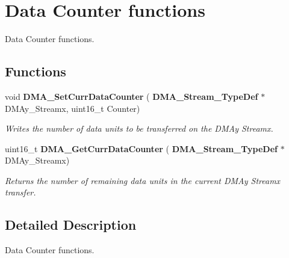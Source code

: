 \section{Data Counter functions}
\label{group__DMA__Group2}


Data Counter functions.  


\subsection*{Functions}
\begin{DoxyCompactItemize}
\item 
void \textbf{ D\+M\+A\+\_\+\+Set\+Curr\+Data\+Counter} (\textbf{ D\+M\+A\+\_\+\+Stream\+\_\+\+Type\+Def} $\ast$D\+M\+Ay\+\_\+\+Streamx, uint16\+\_\+t Counter)
\begin{DoxyCompactList}\small\item\em Writes the number of data units to be transferred on the D\+M\+Ay Streamx. \end{DoxyCompactList}\item 
uint16\+\_\+t \textbf{ D\+M\+A\+\_\+\+Get\+Curr\+Data\+Counter} (\textbf{ D\+M\+A\+\_\+\+Stream\+\_\+\+Type\+Def} $\ast$D\+M\+Ay\+\_\+\+Streamx)
\begin{DoxyCompactList}\small\item\em Returns the number of remaining data units in the current D\+M\+Ay Streamx transfer. \end{DoxyCompactList}\end{DoxyCompactItemize}


\subsection{Detailed Description}
Data Counter functions. 

